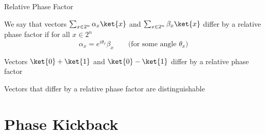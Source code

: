 \documentclass{beamer}
\begin{document}
\begin{frame}{Relative Phase Factor}
        
        We say that vectors $\sum_{x \in 2^n} \alpha_x \ket{x}$ and $\sum_{x
        \in 2^n} \beta_x \ket{x}$ differ by a \alert{relative phase factor} if
        for all $x \in 2^n$
        \[
                \alpha_x = e^{i \theta_x} \beta_x
                \qquad \text{(for some angle $\theta_x$)}
        \]

        \begin{example}
                Vectors $\ket{0} + \ket{1}$ and $\ket{0} - \ket{1}$
                differ by a relative phase factor
        \end{example}

        \pause
        \vfill
        Vectors that differ by a relative phase factor are distinguishable
\end{frame}

\section{Phase Kickback}
\end{document}
